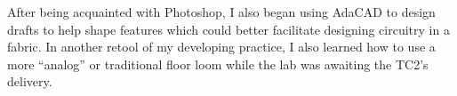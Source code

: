 After being acquainted with Photoshop, I also began using AdaCAD to design drafts to help shape features which could better facilitate designing circuitry in a fabric. In another retool of my developing practice, I also learned how to use a more ``analog'' or traditional floor loom while the lab was awaiting the TC2's delivery. 


